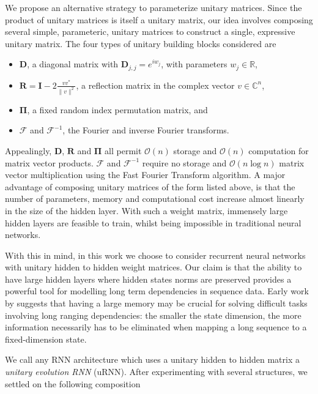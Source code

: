 \documentclass{article} %
\newcommand{\matr}[1]{\mathbf{#1}}
\newcommand\RR{\mathbb{R}}
\begin{document}
We propose an alternative strategy to parameterize unitary matrices. 
Since the product of unitary matrices is itself a unitary matrix, our idea involves
composing several simple, parameteric, unitary matrices to construct a single, expressive unitary matrix.
The four types of unitary building blocks considered are 

\begin{itemize}
  \item $\matr{D}$, a diagonal matrix with $\matr{D}_{j,j} = e^{i w_j}$, with parameters $w_j \in \RR$,
  \item $\matr{R} = \matr{I} - 2 \frac{v v^*}{\|v\|^2}$, a reflection matrix in the complex vector 
  $v \in \mathbb{C}^n$, 
  \item $\matr{\Pi}$, a fixed random index permutation matrix, and
  \item $\mathcal{F}$ and $\mathcal{F}^{-1}$, the Fourier and inverse Fourier transforms.
\end{itemize}

Appealingly, $\matr{D}$, $\matr{R}$ and $\matr{\Pi}$ all permit $\mathcal{O}(n)$ storage and 
$\mathcal{O}(n)$ computation for matrix vector products. $\mathcal{F}$ and $\mathcal{F}^{-1}$
require no storage and $\mathcal{O}(n \log n)$ matrix vector multiplication using the Fast Fourier
Transform algorithm. A major advantage of composing unitary matrices of the form listed above, is 
that the number of parameters, memory and computational cost increase almost linearly in the size
of the hidden layer. With such a weight matrix, immensely large hidden layers are feasible to train, 
whilst being impossible in traditional neural networks. 
 
With this in mind, in this work we choose to consider recurrent neural networks with unitary hidden to hidden
weight matrices. Our claim is that the ability to have large hidden layers where hidden 
states norms are preserved provides a powerful tool for modelling long term dependencies in sequence data. 
Early work by \cite{Yoshua94} suggests that having a large memory may be crucial for solving 
difficult tasks involving long ranging dependencies: the smaller the state dimension, the more
information necessarily has to be eliminated when mapping a long sequence to a fixed-dimension state.

We call any RNN architecture which uses a unitary hidden to hidden matrix a \textit{unitary evolution RNN}
(uRNN). After experimenting with several structures, we settled on the following composition
\end{document}

